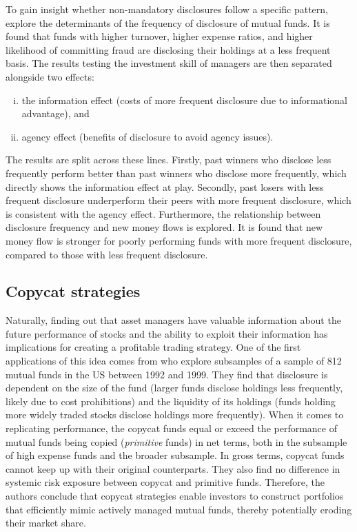 \documentclass[12pt, a4]{article}
\begin{document}
To gain insight whether non-mandatory disclosures follow a specific pattern, \cite{ge} explore the determinants of the frequency of disclosure of mutual funds. It is found that funds with higher turnover, higher expense ratios, and higher likelihood of committing fraud are disclosing their holdings at a less frequent basis. The results testing the investment skill of managers are then separated alongside two effects: 

\begin{enumerate}[i)]
    \item the information effect (costs of more frequent disclosure due to informational advantage), and 
    \item agency effect (benefits of disclosure to avoid agency issues).
\end{enumerate}

The results are split across these lines. Firstly, past winners who disclose less frequently perform better than past winners who disclose more frequently, which directly shows the information effect at play. Secondly, past losers with less frequent disclosure underperform their peers with more frequent disclosure, which is consistent with the agency effect. Furthermore, the relationship between disclosure frequency and new money flows is explored. It is found that new money flow is stronger for poorly performing funds with more frequent disclosure, compared to those with less frequent disclosure.

\subsection{Copycat strategies}

Naturally, finding out that asset managers have valuable information about the future performance of stocks and the ability to exploit their information has implications for creating a profitable trading strategy. One of the first applications of this idea comes from \cite{frank} who explore subsamples of a sample of 812 mutual funds in the \textsc{US} between 1992 and 1999. They find that disclosure is dependent on the size of the fund (larger funds disclose holdings less frequently, likely due to cost prohibitions) and the liquidity of its holdings (funds holding more widely traded stocks disclose holdings more frequently). When it comes to replicating performance, the copycat funds equal or exceed the performance of mutual funds being copied (\textit{primitive} funds) in net terms, both in the subsample of high expense funds and the broader subsample. In gross terms, copycat funds cannot keep up with their original counterparts. They also find no difference in systemic risk exposure between copycat and primitive funds. Therefore, the authors conclude that copycat strategies enable investors to construct portfolios that efficiently mimic actively managed mutual funds, thereby potentially eroding their market share.
\end{document}
